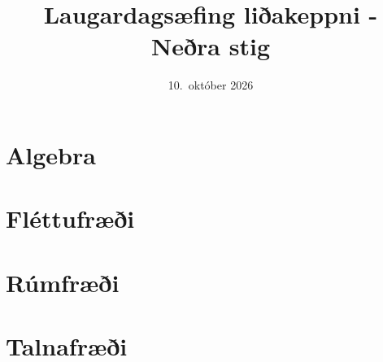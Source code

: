 \documentclass{article}
\title{Laugardagsæfing liðakeppni - Neðra stig}
\date{10.\ október 2026}
\begin{document}
\maketitle

\section{Algebra}
\Problem
\Problem
\Problem
\Problem
\Problem

\newpage
\section{Fléttufræði}
\Problem
\Problem
\Problem
\Problem
\Problem

\newpage
\section{Rúmfræði}
\Problem
\Problem
\Problem
\Problem
\Problem

\newpage
\section{Talnafræði}
\Problem
\Problem
\Problem
\Problem
\Problem
\end{document}

